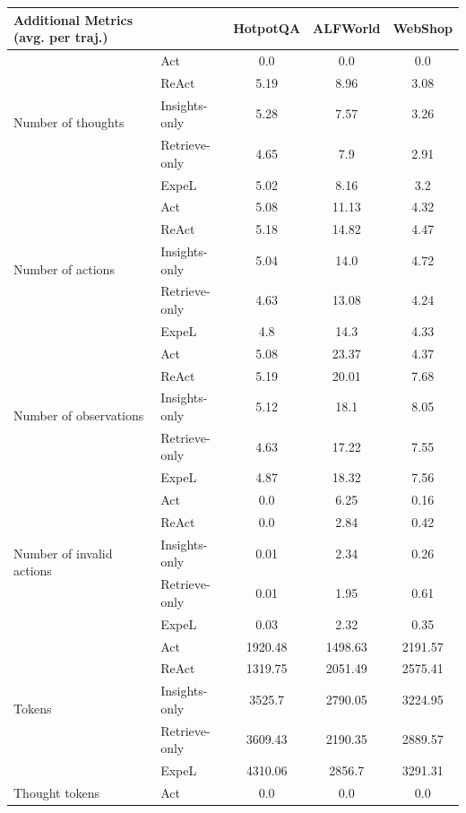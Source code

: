 \documentclass[letterpaper]{article} %
\begin{document}
\begin{table}[!ht]
\centering
    \begin{tabular}{@{}llccc@{}}
        \toprule
        \textbf{Additional Metrics (avg. per traj.)} &  & \textbf{HotpotQA} & \textbf{ALFWorld} & \textbf{WebShop} \\
        \midrule
        \multirow{5}{*}{Number of thoughts}
        & Act & 0.0& 0.0& 0.0\\
		& ReAct & 5.19& 8.96& 3.08\\
		& Insights-only & 5.28& 7.57& 3.26\\
		& Retrieve-only & 4.65& 7.9& 2.91\\
		& ExpeL & 5.02& 8.16& 3.2\\
        \midrule
        \multirow{5}{*}{Number of actions} 
		& Act & 5.08& 11.13& 4.32\\
		& ReAct & 5.18& 14.82& 4.47\\
		& Insights-only & 5.04& 14.0& 4.72\\
		& Retrieve-only & 4.63& 13.08& 4.24\\
		& ExpeL & 4.8& 14.3& 4.33\\
        \midrule
        \multirow{5}{*}{Number of observations} 
		& Act & 5.08& 23.37& 4.37\\
		& ReAct & 5.19& 20.01& 7.68\\
		& Insights-only & 5.12& 18.1& 8.05\\
		& Retrieve-only & 4.63& 17.22& 7.55\\
		& ExpeL & 4.87& 18.32& 7.56\\
        \midrule
        \multirow{5}{*}{Number of invalid actions} 
		& Act & 0.0& 6.25& 0.16\\
		& ReAct & 0.0& 2.84& 0.42\\
		& Insights-only & 0.01& 2.34& 0.26\\
		& Retrieve-only & 0.01& 1.95& 0.61\\
		& ExpeL & 0.03& 2.32& 0.35\\
        \midrule
        \multirow{5}{*}{Tokens} 
        & Act & 1920.48& 1498.63& 2191.57\\
		& ReAct & 1319.75& 2051.49& 2575.41\\
		& Insights-only & 3525.7& 2790.05& 3224.95\\
		& Retrieve-only & 3609.43& 2190.35& 2889.57\\
		& ExpeL & 4310.06& 2856.7& 3291.31\\
        \midrule
        \multirow{5}{*}{Thought tokens} 
		& Act & 0.0& 0.0& 0.0\\

\end{tabular}
\end{table}
\end{document}
